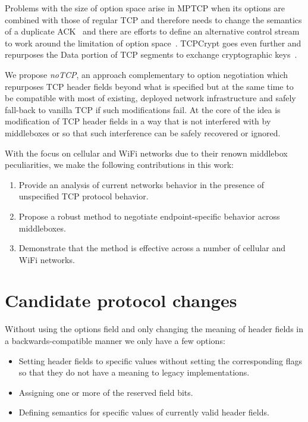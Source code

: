 \documentclass{sig-alternate-10pt}
\begin{document}
Problems with the size of option space arise in MPTCP when its options are combined with those of regular TCP and therefore needs to change the semantics of a duplicate ACK~\cite{Handley:vj} and there are efforts to define an alternative control stream to work around the limitation of option space~\cite{Bonaventure:wx}. TCPCrypt goes even further and repurposes the Data portion of TCP segments to exchange cryptographic keys~\cite{Mazieres:uz}.

We propose \emph{noTCP}, an approach complementary to option negotiation which repurposes TCP header fields beyond what is specified but at the same time to be compatible with most of existing, deployed network infrastructure and safely fall-back to vanilla TCP if such modifications fail. At the core of the idea is modification of TCP header fields in a way that is not interfered with by middleboxes or so that such interference can be safely recovered or ignored.

With the focus on cellular and WiFi networks due to their renown middlebox peculiarities, we make the following contributions in this work:

\begin{enumerate}
    \item Provide an analysis of current networks behavior in the presence of unspecified TCP protocol behavior.
    \item Propose a robust method to negotiate endpoint-specific behavior across middleboxes.
    \item Demonstrate that the method is effective across a number of cellular and WiFi networks.
\end{enumerate}

\section{Candidate protocol changes}

Without using the options field and only changing the meaning of header fields in a backwards-compatible manner we only have a few options:
\begin{itemize}
    \item Setting header fields to specific values without setting the corresponding flags so that they do not have a meaning to legacy implementations.
    \item Assigning one or more of the reserved field bits.
    \item Defining semantics for specific values of currently valid header fields.
\end{itemize}
\end{document}
